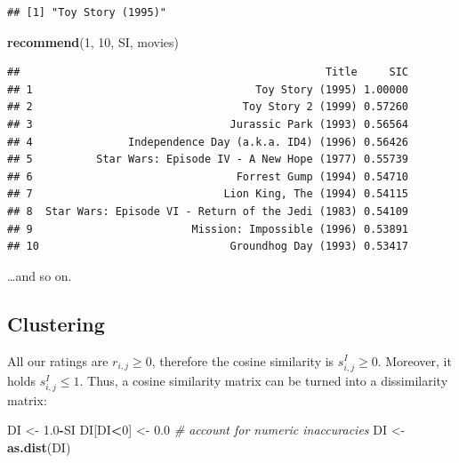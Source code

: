 \documentclass[10pt,b5paper,krantz1]{krantz}
\newenvironment{Shaded}{\begin{snugshade}}{\end{snugshade}}
\newcommand{\CommentTok}[1]{\textcolor[rgb]{0.37,0.37,0.37}{\textit{#1}}}
\newcommand{\DecValTok}[1]{\textcolor[rgb]{0.06,0.06,0.06}{#1}}
\newcommand{\FloatTok}[1]{\textcolor[rgb]{0.06,0.06,0.06}{#1}}
\newcommand{\KeywordTok}[1]{\textcolor[rgb]{0.27,0.27,0.27}{\textbf{#1}}}
\newcommand{\NormalTok}[1]{#1}
\newcommand{\OperatorTok}[1]{\textcolor[rgb]{0.43,0.43,0.43}{\textbf{#1}}}
\newcommand{\StringTok}[1]{\textcolor[rgb]{0.5,0.5,0.5}{#1}}
\begin{document}
\begin{Shaded}
\end{Shaded}

\begin{verbatim}
## [1] "Toy Story (1995)"
\end{verbatim}

\begin{Shaded}
\begin{Highlighting}[]
\KeywordTok{recommend}\NormalTok{(}\DecValTok{1}\NormalTok{, }\DecValTok{10}\NormalTok{, SI, movies)}
\end{Highlighting}
\end{Shaded}

\begin{verbatim}
##                                                Title     SIC
## 1                                   Toy Story (1995) 1.00000
## 2                                 Toy Story 2 (1999) 0.57260
## 3                               Jurassic Park (1993) 0.56564
## 4               Independence Day (a.k.a. ID4) (1996) 0.56426
## 5          Star Wars: Episode IV - A New Hope (1977) 0.55739
## 6                                Forrest Gump (1994) 0.54710
## 7                              Lion King, The (1994) 0.54115
## 8  Star Wars: Episode VI - Return of the Jedi (1983) 0.54109
## 9                         Mission: Impossible (1996) 0.53891
## 10                              Groundhog Day (1993) 0.53417
\end{verbatim}

\ldots{}and so on.

\hypertarget{clustering-1}{%
\subsection{Clustering}\label{clustering-1}}

All our ratings are \(r_{i,j}\ge 0\), therefore the cosine similarity is
\(s_{i,j}^I\ge 0\). Moreover, it holds \(s_{i,j}^I\le 1\).
Thus, a cosine similarity matrix can be turned into
a dissimilarity matrix:

\begin{Shaded}
\begin{Highlighting}[]
\NormalTok{DI <-}\StringTok{ }\FloatTok{1.0}\OperatorTok{-}\NormalTok{SI}
\NormalTok{DI[DI}\OperatorTok{<}\DecValTok{0}\NormalTok{] <-}\StringTok{ }\FloatTok{0.0} \CommentTok{# account for numeric inaccuracies}
\NormalTok{DI <-}\StringTok{ }\KeywordTok{as.dist}\NormalTok{(DI)}
\end{Highlighting}
\end{Shaded}
\end{document}
